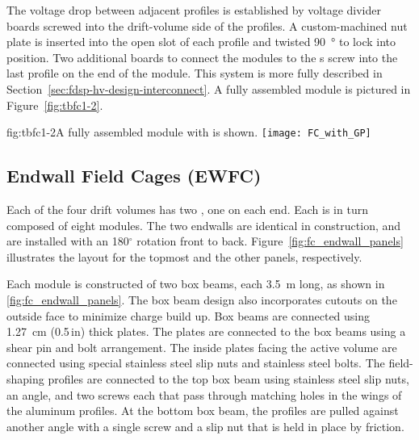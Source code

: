 The voltage drop between adjacent profiles is established by voltage divider boards screwed into the drift-volume side of the profiles. A custom-machined nut plate %
is inserted into the open slot of each profile and twisted \SI{90}{\degree} %
to lock into position. Two additional boards to connect the modules to the s %
screw into the last profile on the  end of the module. This system is %
more fully described in Section~\ref{sec:fdsp-hv-design-interconnect}. A fully assembled module is pictured in Figure~\ref{fig:tbfc1-2}.

\begin{dunefigure}{fig:tbfc1-2}{A fully assembled  module with  is shown.} %
\texttt{[image: FC\_with\_GP]}
\end{dunefigure}


\subsection{Endwall Field Cages (EWFC)}
\label{sec:fdsp-hv-des-fc-ewfc}


Each of the four drift volumes has two , one on each end. Each  is in turn composed of eight  modules.  The two endwalls are identical in construction, and are installed with an 180$^\circ$ rotation front to back.
Figure~\ref{fig:fc_endwall_panels} illustrates the layout for the topmost 
and the other panels, respectively.



Each  module is constructed of two  box beams, each \SI{3.5}{\m} long, as shown in \ref{fig:fc_endwall_panels}. 
The box beam design also incorporates cutouts on the outside face to minimize charge build up. Box beams are connected using \SI{1.27}{\cm} (\num{0.5}\,in) thick  plates. The plates are connected to the box beams using a shear pin and bolt arrangement. The inside plates facing the active volume are connected using special stainless steel slip nuts and stainless steel bolts. The field-shaping profiles are connected to the top box beam using stainless steel slip nuts, an  angle, and two screws each that pass through matching holes in the wings of the aluminum profiles. At the bottom box beam, the profiles are pulled against another  angle with a single screw and a slip nut that is held in place by friction.

